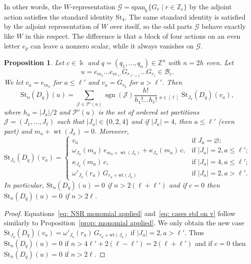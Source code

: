 \documentclass[12pt]{amsart}
\theoremstyle{plain}
\newtheorem{proposition}[theorem]{Proposition}
\theoremstyle{definition}
\numberwithin{equation}{theorem}
\newcommand{\kk}{\Bbbk}
\newcommand{\sgn}{\operatorname{sgn}}
\newcommand{\ZZ}{\mathbb{Z}}
\newcommand{\mc}[1]{\mathcal{#1}}
\newcommand{\calB}{\mathcal B}
\newcommand{\St}{\mathrm{St}}
\newcommand{\length}[1]{\left\lvert #1\right\rvert}
\newcommand{\wt}{\operatorname{wt}}
\DeclareMathOperator*{\iprod}{\overset{\rightarrow}{\prod}}
\begin{document}
In other words, the $W$-representation $\mc{G} = \text{span}_{\kk}\{G_r \mid r \in \ZZ_\epsilon\}$ by the adjoint action satisfies the standard identity $\St_4$. The same standard identity is satisfied by the adjoint representation of $W$ over itself, so the odd parts $\mc{G}$ behave exactly like $W$ in this respect. The difference is that a block of four actions on an even letter $e_p$ can leave a nonzero scalar, while it always vanishes on $\mc{G}$.

\begin{proposition}\label{prop: NSR monomial applied}
    Let $c \in \kk$ and $q = (q_1, \dots, q_n) \in \ZZ^n$ with $n = 2h$ even. Let 
    \[u = e_{m_1} \dots e_{m_{\ell'}} G_{r_{\ell'+1}} \dots G_{r_\ell} \in \calB_c.
    \]
    We let $v_a = e_{m_a}$ for $a \leq \ell'$ and $v_a=G_{r_a}$ for $a > \ell'$. Then 
    \begin{equation}\label{eq: NSR monomial applied}
        \St_n(D_q)(u) = \sum_{\mc{J} \in \mc{P}'(u)} \sgn(\mc{J}) \frac{h!}{h_1! \dots h_\ell!} \iprod_{a\in [\ell]} \St_{J_a} (D_q)(v_a),
    \end{equation}
    where $h_a = \length{J_a}/2$ and $\mc{P}'(u)$ is the set of ordered set partitions $\mathcal J=(J_1,\dots,J_\ell)$ such that $\length{J_a} \in \{0, 2, 4\}$ and if $\length{J_a} = 4$, then $a \leq \ell'$ (even part) and $m_a + \wt(J_a) =0$. Moreover, 
    \begin{equation}\label{eq: cases std on v}
        \St_{J_a}(D_q)(v_a) = \begin{cases}
        v_a  & \text{if } J_a = \varnothing; \\
        \omega_{J_a}(m_a)\, e_{m_a + \wt(J_a)} +  \kappa_{J_a}(m_a)\, c,
        & \text{if } \length{J_a} = 2, a \leq \ell'; \\
      \kappa_{J_a}(m_a)\, c, & \text{if } \length{J_a} = 4,a \leq \ell';\\
        \omega'_{J_a}(r_a) \,G_{r_a+\mathrm{wt}(J_a)} & \text{if } \length{J_a} = 2, a > \ell'.
    \end{cases}
    \end{equation}
    In particular, $\St_n(D_q)(u) = 0$ if $n > 2(\ell+ \ell')$ and if $c = 0$ then $\St_n(D_q)(u) = 0$ if $n > 2\ell$.
\end{proposition}
\begin{proof}
    Equations~\eqref{eq: NSR monomial applied} and~\eqref{eq: cases std on v} follow similarly to Proposition~\ref{prop: monomial applied}. We only obtain the new case $\St_{J_a}(D_q)(v_a) =  \omega'_{J_a}(r_a) \,G_{r_a+\mathrm{wt}(J_a)}$ if $\length{J_a} = 2, a > \ell'$. Thus $\St_n(D_q)(u) = 0$ if $n > 4\ell' + 2(\ell-\ell') =  2(\ell+ \ell')$ and if $c = 0$ then $\St_n(D_q)(u) = 0$ if $n > 2\ell$.
\end{proof}
\end{document}
